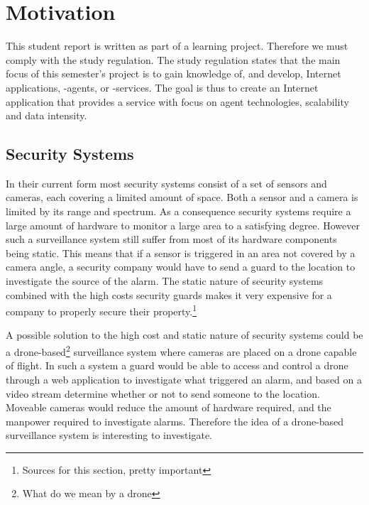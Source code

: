 \section{Motivation}
This student report is written as part of a learning project. Therefore we must comply with the study regulation.
The study regulation states that the main focus of this semester's project is to gain knowledge of, and develop, Internet applications, -agents, or -services.
The goal is thus to create an Internet application that provides a service with focus on agent technologies, scalability and data intensity.

\subsection{Security Systems}
In their current form most security systems consist of a set of sensors and cameras, each covering a limited amount of space.
Both a sensor and a camera is limited by its range and spectrum.
As a consequence security systems require a large amount of hardware to monitor a large area to a satisfying degree.
However such a surveillance system still suffer from most of its hardware components being static.
This means that if a sensor is triggered in an area not covered by a camera angle, a security company would have to send a guard to the location to investigate the source of the alarm.
The static nature of security systems combined with the high costs security guards makes it very expensive for a company to properly secure their property.\footnote{Sources for this section, pretty important}

A possible solution to the high cost and static nature of security systems could be a drone-based\footnote{What do we mean by a drone} surveillance system where cameras are placed on a drone capable of flight.
In such a system a guard would be able to access and control a drone through a web application to investigate what triggered an alarm, and based on a video stream determine whether or not to send someone to the location.
Moveable cameras would reduce the amount of hardware required, and the manpower required to investigate alarms.
Therefore the idea of a drone-based surveillance system is interesting to investigate.




